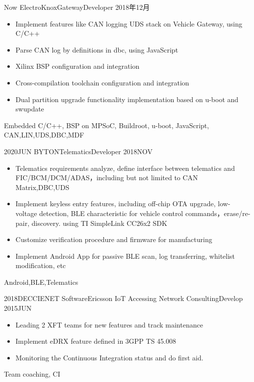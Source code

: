 %
%


 
\begin{experiences}
	
	\experience
	{Now} {ElectroKnox}{Gateway}{Developer}
	{2018年12月 }    {
		\begin{itemize}
			\item Implement features like CAN logging  UDS stack on Vehicle Gateway, using C/C++
			\item Parse CAN log by definitions in dbc, using JavaScript
			\item Xilinx BSP configuration and integration
			\item Cross-compilation toolchain configuration and integration
			\item Dual partition upgrade functionality implementation based on u-boot and swupdate
		\end{itemize}
	}
	{Embedded C/C++, BSP on MPSoC, Buildroot, u-boot, JavaScript, CAN,LIN,UDS,DBC,MDF}
	
	\emptySeparator	
	\experience
	{2020JUN} {BYTON}{Telematics}{Developer}
	{2018NOV }    {
		\begin{itemize}
			\item Telematics requirements analyze, define interface between telematics and FIC/BCM/DCM/ADAS，including but not limited to CAN Matrix,DBC,UDS
			\item Implement keyless entry features, including off-chip OTA upgrade, low-voltage detection, BLE characteristic for vehicle control commands，erase/re-pair, discovery. using TI SimpleLink CC26x2 SDK
			\item Customize verification procedure and firmware for manufacturing
			\item Implement Android App for passive BLE scan, log transferring, whitelist modification, etc
		\end{itemize}
	}
	{Android,BLE,Telematics}
	
	\emptySeparator	
	\experience
	{2018DEC}{CIENET Software}{Ericsson IoT Accessing Network Consulting}{Develop}
	{2015JUN} {
		\begin{itemize}
            \item Leading 2 XFT teams for new features and track maintenance
			\item Implement eDRX feature defined in 3GPP TS 45.008
			\item Monitoring the Continuous Integration status and do first aid.
		\end{itemize}
	}
	{Team coaching, CI}
		

\end{experiences}
